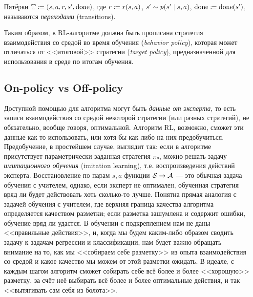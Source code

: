 \begin{definition}
Пятёрки $\T \HM\coloneqq \left( s, a, r, s', \done \right)$, где $r \HM\coloneqq r(s, a)$, $s' \HM\sim p(s' \HM\mid s, a)$, $\done \HM\coloneqq \done(s')$, называются \emph{переходами} (transitions). 
\end{definition}

Таким образом, в RL-алгоритме должна быть прописана стратегия взаимодействия со средой во время обучения (\emph{behavior policy}), которая может отличаться от <<итоговой>> стратегии (\emph{target policy}), предназначенной для использования в среде по итогам обучения. 


\subsection{On-policy vs Off-policy}

Доступной помощью для алгоритма могут быть \emph{данные от эксперта}, то есть записи взаимодействия со средой некоторой стратегии (или разных стратегий), не обязательно, вообще говоря, оптимальной. Алгоритм RL, возможно, сможет эти данные как-то использовать, или хотя бы как либо на них предобучиться. Предобучение, в простейшем случае, выглядит так: если в алгоритме присутствует параметрически заданная стратегия $\pi_\theta$, можно решать задачу \emph{имитационного обучения} (imitation learning), т.е. воспроизведения действий эксперта. Восстановление по парам $s, a$ функции $\St \HM\to \A$ --- это обычная задача обучения с учителем, однако, если эксперт не оптимален, обученная стратегия вряд ли будет действовать хоть сколько-то лучше. Понятна прямая аналогия с задачей обучения с учителем, где верхняя граница качества алгоритма определяется качеством разметки; если разметка зашумлена и содержит ошибки, обучение вряд ли удастся. В обучении с подкреплением нам не даны <<правильные действия>>, и, когда мы будем каким-либо образом сводить задачу к задачам регрессии и классификации, нам будет важно обращать внимание на то, как мы <<собираем себе разметку>> из опыта взаимодействия со средой и какое качество мы можем от этой разметки ожидать. В идеале, с каждым шагом алгоритм сможет собирать себе всё более и более <<хорошую>> разметку, за счёт неё выбирать всё более и более оптимальные действия, и так <<вытягивать сам себя из болота>>. 

